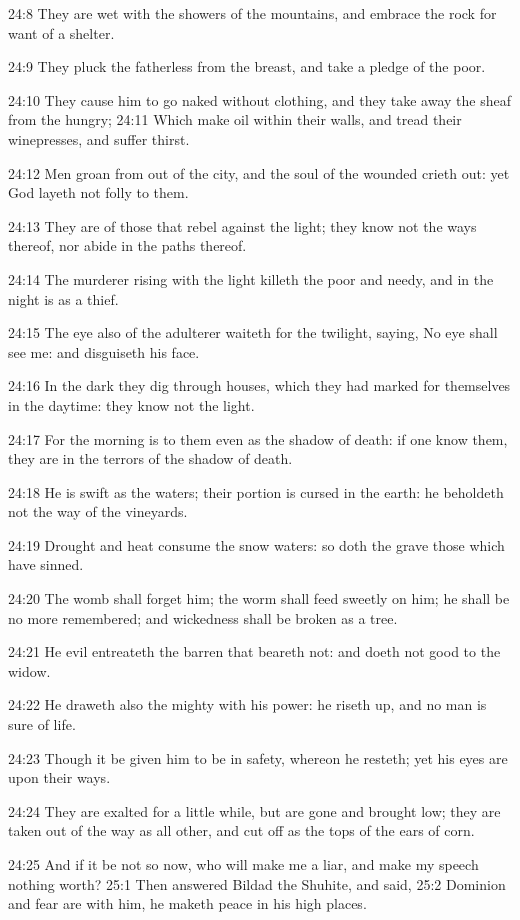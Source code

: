 24:8 They are wet with the showers of the mountains, and embrace the rock for want of a shelter.

24:9 They pluck the fatherless from the breast, and take a pledge of the poor.

24:10 They cause him to go naked without clothing, and they take away the sheaf from the hungry; 24:11 Which make oil within their walls, and tread their winepresses, and suffer thirst.

24:12 Men groan from out of the city, and the soul of the wounded crieth out: yet God layeth not folly to them.

24:13 They are of those that rebel against the light; they know not the ways thereof, nor abide in the paths thereof.

24:14 The murderer rising with the light killeth the poor and needy, and in the night is as a thief.

24:15 The eye also of the adulterer waiteth for the twilight, saying, No eye shall see me: and disguiseth his face.

24:16 In the dark they dig through houses, which they had marked for themselves in the daytime: they know not the light.

24:17 For the morning is to them even as the shadow of death: if one know them, they are in the terrors of the shadow of death.

24:18 He is swift as the waters; their portion is cursed in the earth: he beholdeth not the way of the vineyards.

24:19 Drought and heat consume the snow waters: so doth the grave those which have sinned.

24:20 The womb shall forget him; the worm shall feed sweetly on him; he shall be no more remembered; and wickedness shall be broken as a tree.

24:21 He evil entreateth the barren that beareth not: and doeth not good to the widow.

24:22 He draweth also the mighty with his power: he riseth up, and no man is sure of life.

24:23 Though it be given him to be in safety, whereon he resteth; yet his eyes are upon their ways.

24:24 They are exalted for a little while, but are gone and brought low; they are taken out of the way as all other, and cut off as the tops of the ears of corn.

24:25 And if it be not so now, who will make me a liar, and make my speech nothing worth?  25:1 Then answered Bildad the Shuhite, and said, 25:2 Dominion and fear are with him, he maketh peace in his high places.

